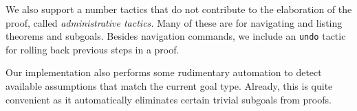 We also support a number tactics that do not contribute to the elaboration of
the proof, called \emph{administrative tactics.}
Many of these are for navigating and listing theorems and subgoals.
Besides navigation commands, we include an \lstinline!undo!
tactic for rolling back previous steps in a proof.

Our implementation also performs some rudimentary automation to detect
available assumptions that match the current goal type. Already, this is quite
convenient as it automatically eliminates certain trivial subgoals from proofs.




